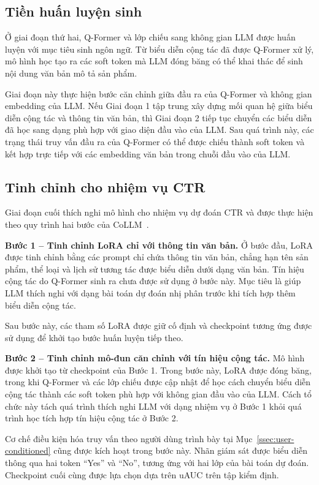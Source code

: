 \subsection{Tiền huấn luyện sinh}
\label{ssec:stage2}

Ở giai đoạn thứ hai, Q-Former và lớp chiếu sang không gian LLM được huấn luyện với mục tiêu sinh
ngôn ngữ. Từ biểu diễn cộng tác đã được Q-Former xử lý, mô hình học tạo ra các soft token mà LLM
đóng băng có thể khai thác để sinh nội dung văn bản mô tả sản phẩm.

Giai đoạn này thực hiện bước căn chỉnh giữa đầu ra của Q-Former và không gian embedding của LLM.
Nếu Giai đoạn 1 tập trung xây dựng mối quan hệ giữa biểu diễn cộng tác và thông tin văn bản, thì
Giai đoạn 2 tiếp tục chuyển các biểu diễn đã học sang dạng phù hợp với giao diện đầu vào của LLM.
Sau quá trình này, các trạng thái truy vấn đầu ra của Q-Former có thể được chiếu thành soft token
và kết hợp trực tiếp với các embedding văn bản trong chuỗi đầu vào của LLM.

\subsection{Tinh chỉnh cho nhiệm vụ CTR}
\label{ssec:stage3}

Giai đoạn cuối thích nghi mô hình cho nhiệm vụ dự đoán CTR và được thực hiện theo quy trình hai
bước của CoLLM~\cite{collm2023}.

\textbf{Bước 1 -- Tinh chỉnh LoRA chỉ với thông tin văn bản.} Ở bước đầu, LoRA được tinh chỉnh
bằng các prompt chỉ chứa thông tin văn bản, chẳng hạn tên sản phẩm, thể loại và lịch sử tương
tác được biểu diễn dưới dạng văn bản. Tín hiệu cộng tác do Q-Former sinh ra chưa được sử dụng ở
bước này. Mục tiêu là giúp LLM thích nghi với dạng bài toán dự đoán nhị phân trước khi tích hợp
thêm biểu diễn cộng tác.

Sau bước này, các tham số LoRA được giữ cố định và checkpoint tương ứng được sử dụng để khởi tạo
bước huấn luyện tiếp theo.

\textbf{Bước 2 -- Tinh chỉnh mô-đun căn chỉnh với tín hiệu cộng tác.} Mô hình được khởi tạo từ
checkpoint của Bước 1. Trong bước này, LoRA được đóng băng, trong khi Q-Former và các lớp chiếu
được cập nhật để học cách chuyển biểu diễn cộng tác thành các soft token phù hợp với không gian
đầu vào của LLM. Cách tổ chức này tách quá trình thích nghi LLM với dạng nhiệm vụ ở Bước 1 khỏi
quá trình học tích hợp tín hiệu cộng tác ở Bước 2.

Cơ chế điều kiện hóa truy vấn theo người dùng trình bày tại Mục~\ref{ssec:user-conditioned} cũng
được kích hoạt trong bước này. Nhãn giám sát được biểu diễn thông qua hai token ``Yes'' và
``No'', tương ứng với hai lớp của bài toán dự đoán. Checkpoint cuối cùng được lựa chọn dựa trên
uAUC trên tập kiểm định.

